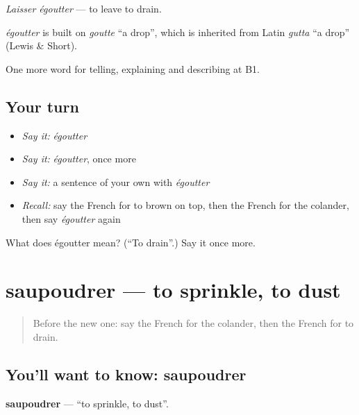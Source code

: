 \emph{Laisser égoutter} — to leave to drain.

\begin{cousinweb}
\emph{égoutter} is built on \emph{goutte} \textquotedblleft{}a drop\textquotedblright{}, which is inherited from Latin \emph{gutta} \textquotedblleft{}a drop\textquotedblright{} (Lewis \& Short).
\end{cousinweb}

\begin{grammarlens}[title={What you've built}]
One more word for telling, explaining and describing at B1.
\end{grammarlens}

\subsection*{Your turn}
\begin{itemize}
\raggedright
  \item \emph{Say it:} \emph{égoutter}
  \item \emph{Say it:} \emph{égoutter}, once more
  \item \emph{Say it:} a sentence of your own with \emph{égoutter}
  \item \emph{Recall:} say the French for to brown on top, then the French for the colander, then say \emph{égoutter} again
\end{itemize}

\begin{tcolorbox}[breakable,colback=teal!4,colframe=teal!35!black,title={Before you move on}]
What does égoutter mean? (\textquotedblleft{}To drain\textquotedblright{}.) Say it once more.
\end{tcolorbox}
\section[saupoudrer]{saupoudrer — to sprinkle, to dust}

\label{lesson:FR-C332-saupoudrer}



\begin{quote}
Before the new one: say the French for the colander, then the French for to drain.
\end{quote}

\subsection*{You'll want to know: saupoudrer}
\textbf{saupoudrer} — \textquotedblleft{}to sprinkle, to dust\textquotedblright{}.

